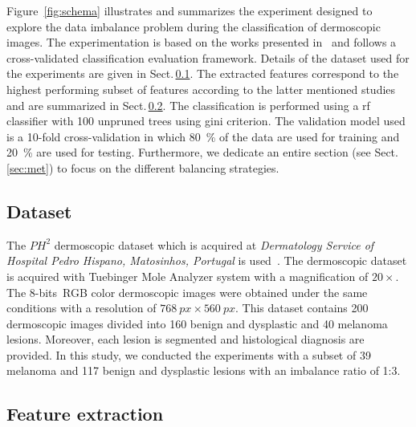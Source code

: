 \noindent Figure~\ref{fig:schema} illustrates and summarizes the experiment designed to explore the data imbalance problem during the classification of dermoscopic images.
The experimentation is based on the works presented in~\cite{rastgoo2015automatic, rastgoo2015ensemble} and follows a cross-validated classification evaluation framework.
Details of the dataset used for the experiments are given in Sect.\,\ref{sec:dataset}. 
The extracted features correspond to the highest performing subset of features according to the latter mentioned studies and are summarized in Sect.\,\ref{sec:feat}.
The classification is performed using a \ac{rf} classifier with 100 unpruned trees using gini criterion.
The validation model used is a 10-fold cross-validation in which \SI{80}{\percent} of the data are used for training and \SI{20}{\percent} are used for testing.
Furthermore, we dedicate an entire section (see Sect.\,\ref{sec:met}) to focus on the different balancing strategies.

\subsection{Dataset}\label{sec:dataset}
The $PH^{2}$ dermoscopic dataset which is acquired at \textit{Dermatology Service of Hospital Pedro Hispano, Matosinhos, Portugal} is used~\cite{barata2013two}.
The dermoscopic dataset is acquired with Tuebinger Mole Analyzer system with a magnification of $20 \times$.
The 8-bits~RGB color dermoscopic images were obtained under the same conditions with a resolution of $\SI{768}{px} \times \SI{560}{px}$. 
This dataset contains 200 dermoscopic images divided into 160 benign and dysplastic and 40 melanoma lesions. Moreover, each lesion is segmented and histological diagnosis are provided. 
In this study, we conducted the experiments with a subset of 39 melanoma and 117 benign and dysplastic lesions with an imbalance ratio of 1:3.

\subsection{Feature extraction}\label{sec:feat}


